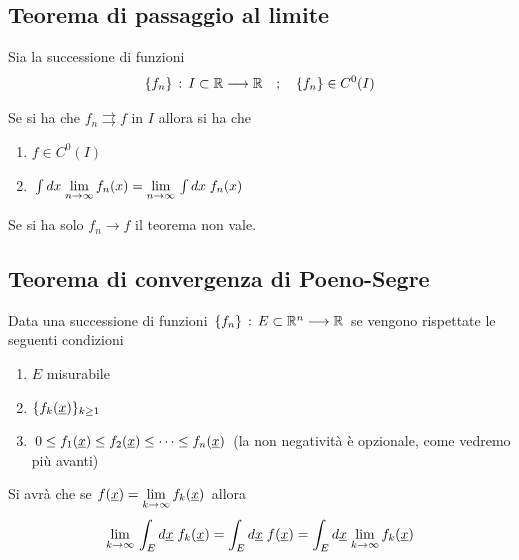 \begin{figure}[!htb]
\end{figure}

\subsection{Teorema di passaggio al limite}

Sia la successione di funzioni
\begin{align}
	\{f_n\} \, : \, I \subset \mathbb{R} \longrightarrow \mathbb{R} \quad ; \quad \{f_n\} \in C^0(I)
\end{align}

Se si ha che $f_n \rightrightarrows f$ in $I$ allora si ha che
\begin{enumerate}
	\item $f\in C^0(I)$
	\item $\int dx \; \underset{n \rightarrow \infty}{\lim} \,f_n(x)=  \underset{n \rightarrow \infty}{\lim} \, \int dx \; f_n(x)$ 
\end{enumerate}

Se si ha solo $f_n \longrightarrow f$ il teorema non vale.

\newpage

\subsection{Teorema di convergenza di Poeno-Segre}

Data una successione di funzioni $\{f_n\} \, : \, E \subset \mathbb{R}^n \longrightarrow \mathbb{R}$ se vengono rispettate le seguenti condizioni
\begin{enumerate}
	\item $E$ misurabile
	\item $\{f_k(\underline{x})\}_{k\geq 1} $
	\item $0\leq f_1(\underline{x}) \leq f_2(\underline{x}) \leq \dots \leq f_n(\underline{x}) $ (la non negatività è opzionale, come vedremo più avanti)
\end{enumerate}

Si avrà che se $f(\underline{x})=\underset{k \rightarrow \infty}{\lim} \,f_k(\underline{x})$ allora
\begin{align}
	\underset{k \rightarrow \infty}{\lim} \, \int_{E} d\underline{x} \; f_k(\underline{x})= \int_{E} d\underline{x} \; f(\underline{x})= \int_{E} d\underline{x} \;\underset{k \rightarrow \infty}{\lim} \,  f_k(\underline{x})
\end{align}

